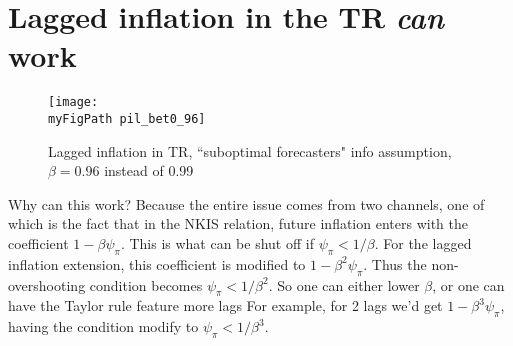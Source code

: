 \documentclass[11pt]{article}
\def \myFigPath {../figures/}
\renewcommand{\[}{\begin{equation}}
\renewcommand{\]}{\end{equation}}
\def\mySmallerFigScale{0.18}
\begin{document}
\section{Lagged inflation in the TR \emph{can} work}

\begin{figure}[h!]
\texttt{[image: \\myFigPath pil\_bet0\_96]}
\caption{ Lagged inflation in TR, ``suboptimal forecasters" info assumption, $\beta = 0.96$ instead of 0.99}
\end{figure}

Why can this work? Because the entire issue comes from two channels, one of which is the fact that in the NKIS relation, future inflation enters with the coefficient $1-\beta\psi_{\pi}$. This is what can be shut off if $\psi_{\pi} < 1/\beta$. For the lagged inflation extension, this coefficient is modified to $1-\beta^2\psi_{\pi}$. Thus the non-overshooting condition becomes $\psi_{\pi} < 1/\beta^2$. So one can either lower $\beta$, or one can have the Taylor rule feature more lags For example, for 2 lags we'd get $1-\beta^3\psi_{\pi}$, having the condition modify to  $\psi_{\pi} < 1/\beta^3$.
\end{document}
